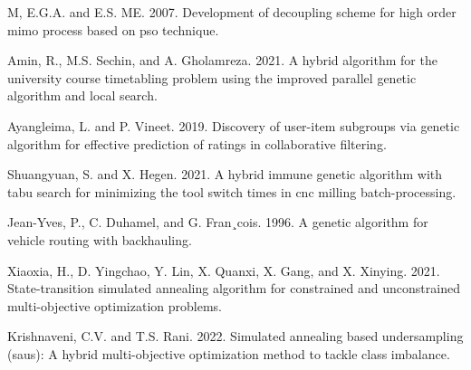 \documentclass[default,iicol]{sn-jnl}
\theoremstyle{thmstyleone}
\theoremstyle{thmstyletwo}
\theoremstyle{thmstylethree}
\begin{document}
\begin{thebibliography}{99}
M, E.G.A. and E.S. ME. 2007. Development of decoupling scheme for high order mimo process based on pso technique. 

Amin, R., M.S. Sechin, and A. Gholamreza.
2021. A hybrid algorithm for the university
course timetabling problem using the improved
parallel genetic algorithm and local search.



Ayangleima, L. and P. Vineet. 2019. Discovery
of user-item subgroups via genetic algorithm for
effective prediction of ratings in collaborative
filtering.

Shuangyuan, S. and X. Hegen. 2021. A hybrid
immune genetic algorithm with tabu search for
minimizing the tool switch times in cnc milling
batch-processing. 

Jean-Yves, P., C. Duhamel, and G. Fran¸cois.
1996. A genetic algorithm for vehicle routing
with backhauling. 


Xiaoxia, H., D. Yingchao, Y. Lin, X. Quanxi,
X. Gang, and X. Xinying. 2021. State-transition
simulated annealing algorithm for constrained
and unconstrained multi-objective optimization
problems. 

Krishnaveni, C.V. and T.S. Rani. 2022. Simulated annealing based undersampling (saus): A hybrid multi-objective optimization method to
tackle class imbalance. 



\end{thebibliography}
\end{document}
